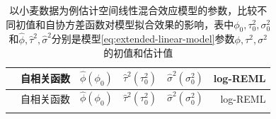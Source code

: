 \documentclass[12pt,a4paper,UTF8,twoside]{book}
\theoremstyle{definition}
\theoremstyle{definition}
\theoremstyle{definition}
\theoremstyle{remark}
\begin{document}
\begin{longtable}[]{@{}crrrrr@{}}
\caption{\label{tab:yields-model-compare}
以小麦数据为例估计空间线性混合效应模型的参数，比较不同初值和自协方差函数对模型拟合效果的影响，表中\(\phi_0,\tau^2_{0},\sigma^2_{0}\)和\(\hat{\phi},\hat{\tau}^2,\hat{\sigma}^2\)分别是模型\eqref{eq:extended-linear-model}参数\(\phi,\tau^2,\sigma^2\)的初值和估计值}\tabularnewline
\toprule
\begin{minipage}[b]{0.09\columnwidth}\centering
\strut
\end{minipage} & \begin{minipage}[b]{0.14\columnwidth}\raggedleft
自相关函数\strut
\end{minipage} & \begin{minipage}[b]{0.20\columnwidth}\raggedleft
\(\hat{\phi}(\phi_0)\)\strut
\end{minipage} & \begin{minipage}[b]{0.20\columnwidth}\raggedleft
\(\hat{\tau}^2(\tau^2_{0})\)\strut
\end{minipage} & \begin{minipage}[b]{0.08\columnwidth}\raggedleft
\(\hat{\sigma}^2(\sigma^2_{0})\)\strut
\end{minipage} & \begin{minipage}[b]{0.13\columnwidth}\raggedleft
log-REML\strut
\end{minipage}\tabularnewline
\midrule
\endfirsthead
\toprule
\begin{minipage}[b]{0.09\columnwidth}\centering
\strut
\end{minipage} & \begin{minipage}[b]{0.14\columnwidth}\raggedleft
自相关函数\strut
\end{minipage} & \begin{minipage}[b]{0.20\columnwidth}\raggedleft
\(\hat{\phi}(\phi_0)\)\strut
\end{minipage} & \begin{minipage}[b]{0.20\columnwidth}\raggedleft
\(\hat{\tau}^2(\tau^2_{0})\)\strut
\end{minipage} & \begin{minipage}[b]{0.08\columnwidth}\raggedleft
\(\hat{\sigma}^2(\sigma^2_{0})\)\strut
\end{minipage} & \begin{minipage}[b]{0.13\columnwidth}\raggedleft
log-REML\strut
\end{minipage}\tabularnewline
\midrule
\endhead
\begin{minipage}[t]{0.09\columnwidth}\centering

\end{minipage}
\end{longtable}
\end{document}
